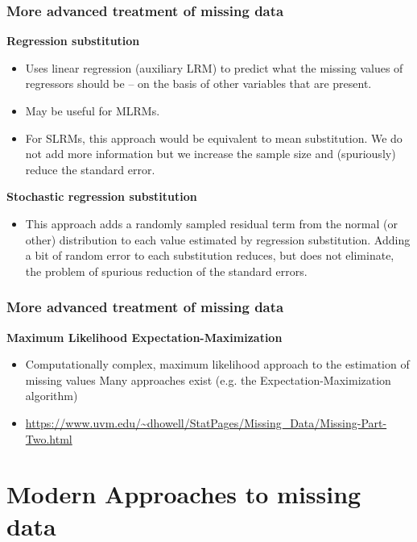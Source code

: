 \documentclass{beamer}
\begin{document}
\begin{frame}
\frametitle{More advanced treatment of missing data}
\textbf{Regression substitution}
  \begin{itemize}
  \item Uses linear regression (auxiliary LRM) to predict what the missing values of regressors should be -- on the basis of other variables that are present.
  \item May be useful for MLRMs.
  \item For SLRMs, this approach would be equivalent to mean substitution. We do not add more information but we increase the sample size and (spuriously) reduce the standard error.

   \end{itemize}
  \vspace{0.2cm}
\textbf{Stochastic regression substitution}
  \begin{itemize}
  \item This approach adds a randomly sampled residual term from the normal (or other) distribution to each value estimated by regression substitution. Adding a bit of random error to each substitution reduces, but does not eliminate, the problem of spurious reduction of the standard errors.
   \end{itemize}
\end{frame}
\begin{frame}
\frametitle{More advanced treatment of missing data}

\textbf{Maximum Likelihood Expectation-Maximization}
  \begin{itemize}
  \item Computationally complex, maximum likelihood approach to the estimation of missing values Many approaches exist (e.g. the Expectation-Maximization algorithm)
  \item[] \scriptsize{\url{https://www.uvm.edu/~dhowell/StatPages/Missing_Data/Missing-Part-Two.html}}
   \end{itemize}
 
\end{frame}

\section{Modern Approaches to missing data}
\end{document}
